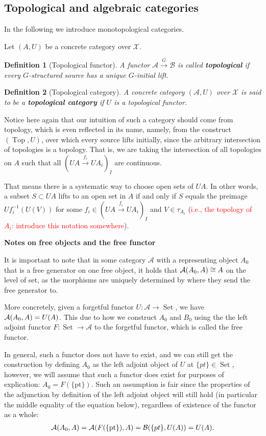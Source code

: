 \documentclass[12pt,a4paper]{article}
\newtheorem{definition}{Definition}[section] %
\DeclareMathOperator{\Set}{Set}
\DeclareMathOperator{\Top}{Top}
\def\HomA{\ensuremath\mathcal{A}}
\def\HomB{\ensuremath\mathcal{B}}
\begin{document}
\subsection{Topological and algebraic categories}
In the following we  introduce monotopological categories. 

Let $(A, U)$ be a concrete category over $\mathcal{X}$. 
\begin{definition}[Topological functor]
A functor $\mathcal{A} \stackrel{G}{\to}\mathcal{B}$ is called \textbf{topological} if every $G$-structured source has a unique $G$-initial lift. 
 \end{definition}
 
 \begin{definition}[Topological category]
 A concrete category $(\mathcal{A}, U)$ over $\mathcal{X}$ is said to be a \textbf{topological category} if $U$ is a topological functor. 
 \end{definition}
 
 Notice here again that our intuition of such a category should come from topology, which is even reflected in its name, namely, from the construct $(\Top, U)$,  over which every source lifts initially, since the arbitrary intersection of topologies is a topology. That is, we are taking the intersection of all topologies on $A$ such that all $(UA \stackrel{f_i}{\to} UA_i)_I$ are continuous.
 
  That means there is a systematic way to choose open sets of $UA$. In other words,  a subset $S \subset UA$ lifts to an open set in $A$ if and only if $S$ equals the preimage $Uf_i^{-1}(U(V))$ for some  $f_i \in (UA \stackrel{f_i}{\to} UA_i)_I$ and $V \in  \tau_{A_i}$ (\textcolor{red}{i.e., the topology of $A_i$: introduce this notation somewhere}).
 

\textbf{Notes on free objects and the free functor}

It is important to note that in some category $\mathcal{A}$ with a representing object $A_0$ that is a free generator on one free object, it holds that $\HomA(A_0,A) \cong A$ on the level of set, as the morphisms are uniquely determined by where they send the free generator to. 

More concretely, given a forgetful functor $U: \mathcal{A} \to \Set$, we have $\HomA(A_0,A) = U(A)$. This due to how we construct $A_0$ and $B_0$ using the the left adjoint functor $F: \Set \to \mathcal{A}$ to the forgetful functor, which is called the free functor. 

In general, such a functor does not have to exist, and we can still get the construction by defining $A_0$ as the left adjoint object of $U$ at $\{pt\} \in \Set$, however, we will assume that such a functor does exist for purposes of explication: $A_0 = F(\{\text{pt}\})$. Such an assumption is fair since the properties of the adjunction by definition of the left adjoint object will still hold (in particular the middle equality of the equation below), regardless of existence of the functor as a whole: \begin{align*}
	\HomA(A_0, A) = \HomA(F(\{\text{pt}\}), A) = \HomB(\{pt\}, U(A)) = U(A).
\end{align*}
\end{document}
